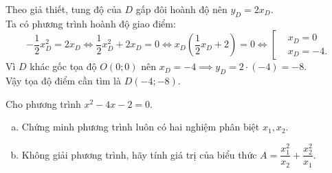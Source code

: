 \begin{bt}
{\begin{enumerate}[a)]
	Theo giả thiết, tung độ của $D$ gấp đôi hoành độ nên $y_D = 2x_D$.\\
	Ta có phương trình hoành độ giao điểm:
	$$-\dfrac{1}{2}x_D^2 = 2x_D \iff \dfrac{1}{2}x_D^2 + 2x_D = 0 \iff x_D\left(\dfrac{1}{2}x_D + 2\right) = 0 \iff \left[\begin{aligned} &x_D = 0 \\ &x_D = -4. \end{aligned}\right.$$
	Vì $D$ khác gốc tọa độ $O(0;0)$ nên $x_D = -4 \implies y_D = 2 \cdot (-4) = -8$.\\
	Vậy tọa độ điểm cần tìm là $D(-4; -8)$.
\end{enumerate}
}
\end{bt}

\begin{bt}%
Cho phương trình $x^2 - 4x - 2 = 0$.
\begin{enumerate}[a)]
	\item Chứng minh phương trình luôn có hai nghiệm phân biệt $x_1, x_2$.
	\item Không giải phương trình, hãy tính giá trị của biểu thức $A = \dfrac{x_1^2}{x_2} + \dfrac{x_2^2}{x_1}$.
\end{enumerate}
\end{bt}

